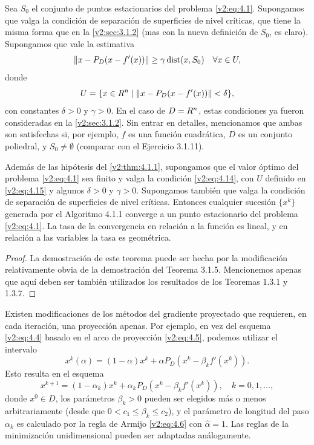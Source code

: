 Sea $S_0$ el conjunto de puntos estacionarios del problema \eqref{v2:eq:4.1}. Supongamos que valga la condición de separación de superficies de nivel críticas, que tiene la misma forma que en la \cref{v2:sec:3.1.2} (mas con la nueva definición de $S_0$, es claro). Supongamos que vale la estimativa
\begin{equation}
    \|x - P_D(x - f'(x))\| \ge \gamma \operatorname{dist}(x, S_0) \quad \forall x \in U,
    \label{v2:eq:4.14}
\end{equation}
donde
\begin{equation}
    U = \{x \in R^n \mid \|x - P_D(x - f'(x))\| < \delta\},
    \label{v2:eq:4.15}
\end{equation}
con constantes $\delta > 0$ y $\gamma > 0$. En el caso de $D = R^n$, estas condiciones ya fueron consideradas en la \cref{v2:sec:3.1.2}. Sin entrar en detalles, mencionamos que ambas son satisfechas si, por ejemplo, $f$ es una función cuadrática, $D$ es un conjunto poliedral, y $S_0 \neq \emptyset$ (comparar con el Ejercicio 3.1.11).

\begin{theorem}\label{v2:thm:4.1.2}
    Además de las hipótesis del \cref{v2:thm:4.1.1}, supongamos que el valor óptimo del problema \eqref{v2:eq:4.1} sea finito y valga la condición \eqref{v2:eq:4.14}, con $U$ definido en \eqref{v2:eq:4.15} y algunos $\delta > 0$ y $\gamma > 0$. Supongamos también que valga la condición de separación de superficies de nivel críticas.
    Entonces cualquier sucesión $\{x^k\}$ generada por el Algoritmo 4.1.1 converge a un punto estacionario del problema \eqref{v2:eq:4.1}. La tasa de la convergencia en relación a la función es lineal, y en relación a las variables la tasa es geométrica.
\end{theorem}
\begin{proof}
    La demostración de este teorema puede ser hecha por la modificación relativamente obvia de la demostración del Teorema 3.1.5. Mencionemos apenas que aquí deben ser también utilizados los resultados de los Teoremas 1.3.1 y 1.3.7.
\end{proof}


Existen modificaciones de los métodos del gradiente proyectado que requieren, en cada iteración, una proyección apenas. Por ejemplo, en vez del esquema \eqref{v2:eq:4.4} basado en el arco de proyección \eqref{v2:eq:4.5}, podemos utilizar el intervalo
\[
    x^k(\alpha) = (1 - \alpha)x^k + \alpha P_D(x^k - \beta_k f'(x^k)).
\]
Esto resulta en el esquema
\begin{equation}
    x^{k+1} = (1 - \alpha_k)x^k + \alpha_k P_D(x^k - \beta_k f'(x^k)), \quad k = 0, 1, \dots,
    \label{v2:eq:4.16}
\end{equation}
donde $x^0 \in D$, los parámetros $\beta_k > 0$ pueden ser elegidos más o menos arbitrariamente (desde que $0 < c_1 \le \beta_k \le c_2$), y el parámetro de longitud del paso $\alpha_k$ es calculado por la regla de Armijo \eqref{v2:eq:4.6} con $\hat{\alpha} = 1$. Las reglas de la minimización unidimensional pueden ser adaptadas análogamente.

